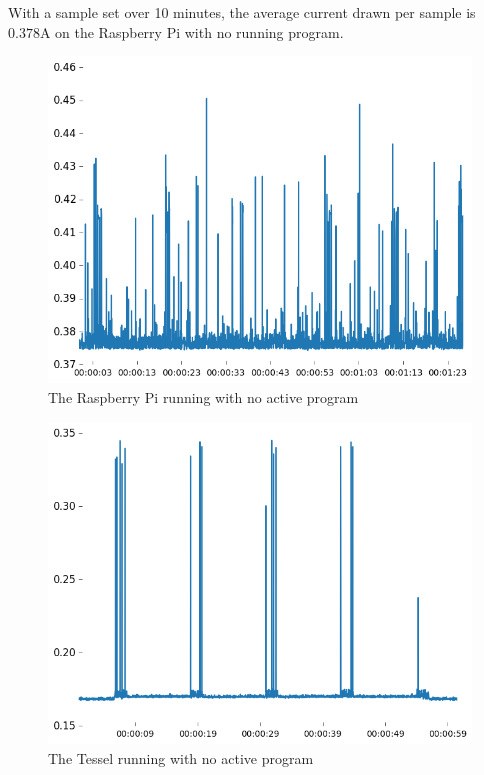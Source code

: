 With a sample set over 10 minutes, the average current drawn per sample is $0.378\si{\ampere}$ on the Raspberry Pi with no running program.

\begin{figure}[h!]
\centering
\includegraphics[scale=0.55]{fig/graphs/baseuse_rasp.png}
\caption{The Raspberry Pi running with no active program}
\label{fig:baserasp}
\end{figure}
\newpage

\begin{figure}[h!]
\centering
\includegraphics[scale=0.6]{fig/graphs/baseuse_tessel.png}
\caption{The Tessel running with no active program}
\label{fig:basetessel}
\end{figure}

